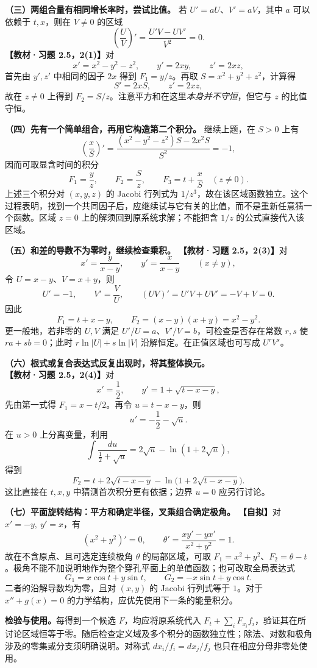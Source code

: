\textbf{（三）两组合量有相同增长率时，尝试比值。}
若 $U'=aU$、$V'=aV$，其中 $a$ 可以依赖于 $t,x$，则在 $V\ne0$ 的区域
\[
\left(\frac UV\right)'=\frac{U'V-UV'}{V^2}=0.
\]
\textbf{【教材·习题 2.5，2(1)】}对
\[
x'=x^2-y^2-z^2,\qquad y'=2xy,\qquad z'=2xz,
\]
首先由 $y',z'$ 中相同的因子 $2x$ 得到 $F_1=y/z$。再取 $S=x^2+y^2+z^2$，计算得
\[
S'=2xS,\qquad z'=2xz,
\]
故在 $z\ne0$ 上得到 $F_2=S/z$。注意平方和在这里\emph{本身并不守恒}，但它与 $z$ 的比值守恒。

\textbf{（四）先有一个简单组合，再用它构造第二个积分。}
继续上题，在 $S>0$ 上有
\[
\left(\frac{x}{S}\right)'=
\frac{(x^2-y^2-z^2)S-2x^2S}{S^2}=-1,
\]
因而可取显含时间的积分
\[
\boxed{F_1=\frac yz,\qquad F_2=\frac Sz,\qquad F_3=t+\frac xS\quad(z\ne0).}
\]
上述三个积分对 $(x,y,z)$ 的 Jacobi 行列式为 $1/z^3$，故在该区域函数独立。这个过程表明，找到一个共同因子后，应继续试与它有关的比值，而不是重新任意猜一个函数。区域 $z=0$ 上的解须回到原系统求解；不能把含 $1/z$ 的公式直接代入该区域。

\textbf{（五）和差的导数不为零时，继续检查乘积。}
\textbf{【教材·习题 2.5，2(3)】}对
\[
x'=\frac{y}{x-y},\qquad y'=\frac{x}{x-y}\qquad(x\ne y),
\]
令 $U=x-y$、$V=x+y$，则
\[
U'=-1,\qquad V'=\frac VU,
\qquad (UV)'=U'V+UV'=-V+V=0.
\]
因此
\[
\boxed{F_1=t+x-y,\qquad F_2=(x-y)(x+y)=x^2-y^2.}
\]
更一般地，若非零的 $U,V$ 满足 $U'/U=a$、$V'/V=b$，可检查是否存在常数 $r,s$ 使 $ra+sb=0$；此时 $r\ln|U|+s\ln|V|$ 沿解恒定。在正值区域也可写成 $U^rV^s$。

\textbf{（六）根式或复合表达式反复出现时，将其整体换元。}
\textbf{【教材·习题 2.5，2(4)】}对
\[
x'=\frac12,\qquad y'=1+\sqrt{t-x-y},
\]
先由第一式得 $F_1=x-t/2$。再令 $u=t-x-y$，则
\[
u'=-\frac12-\sqrt u.
\]
在 $u>0$ 上分离变量，利用
\[
\int\frac{du}{\frac12+\sqrt u}
=2\sqrt u-\ln(1+2\sqrt u),
\]
得到
\[
\boxed{F_2=t+2\sqrt{t-x-y}-\ln\bigl(1+2\sqrt{t-x-y}\bigr).}
\]
这比直接在 $t,x,y$ 中猜测首次积分更有依据；边界 $u=0$ 应另行讨论。

\textbf{（七）平面旋转结构：平方和确定半径，叉乘组合确定极角。}
\textbf{【自拟】}对 $x'=-y,\ y'=x$，有
\[
(x^2+y^2)'=0,\qquad
\theta'=\frac{xy'-yx'}{x^2+y^2}=1.
\]
故在不含原点、且可选定连续极角 $\theta$ 的局部区域，可取 $F_1=x^2+y^2$、$F_2=\theta-t$。极角不能不加说明地作为整个穿孔平面上的单值函数；也可改取全局表达式
\[
\boxed{G_1=x\cos t+y\sin t,\qquad
G_2=-x\sin t+y\cos t.}
\]
二者的沿解导数均为零，且对 $(x,y)$ 的 Jacobi 行列式等于 $1$。对于 $x''+g(x)=0$ 的力学结构，应优先使用下一条的能量积分。

\textbf{检验与使用。}每得到一个候选 $F$，均应将原系统代入 $F_t+\sum_iF_{x_i}f_i$，验证其在所讨论区域恒等于零。随后检查定义域及多个积分的函数独立性；除法、对数和极角涉及的零集或分支须明确说明。对称式 $dx_i/f_i=dx_j/f_j$ 也只在相应分母非零处使用。

